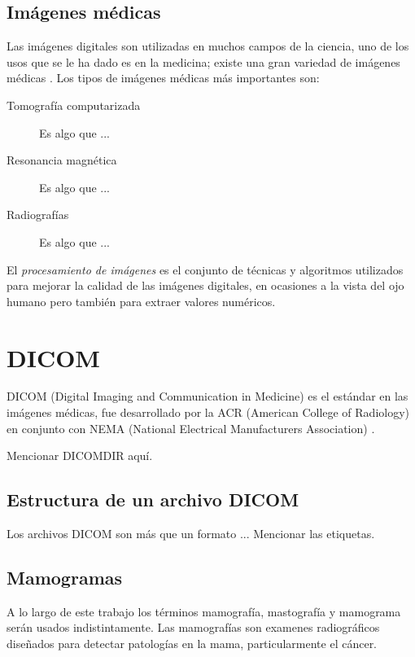 \subsection{Imágenes médicas}

Las imágenes digitales son utilizadas en muchos campos de la ciencia, uno de
los usos que se le ha dado es en la medicina; existe una gran variedad de
imágenes médicas \cite{suetens2009fundamentals}. Los tipos de imágenes médicas
más importantes son:

\begin{description}
    \item[Tomografía computarizada] Es algo que ...
    \item[Resonancia magnética] Es algo que ...
    \item[Radiografías] Es algo que ...
\end{description}

El \textit{procesamiento de imágenes} es el conjunto de técnicas y algoritmos
utilizados para mejorar la calidad de las imágenes digitales, en ocasiones a la
vista del ojo humano pero también para extraer valores numéricos.

\section{DICOM}

DICOM (Digital Imaging and Communication in Medicine) es el estándar en las
imágenes médicas, fue desarrollado por la ACR (American College of Radiology)
en conjunto con NEMA (National Electrical Manufacturers Association)
\cite{acrnema, pianykh2011digital}.  

Mencionar DICOMDIR aquí.

\subsection{Estructura de un archivo DICOM}

Los archivos DICOM son más que un formato ... Mencionar las etiquetas.

\subsection{Mamogramas}

A lo largo de este trabajo los términos mamografía, mastografía y mamograma
serán usados indistintamente. Las mamografías son examenes radiográficos
diseñados para detectar patologías en la mama, particularmente el cáncer.

